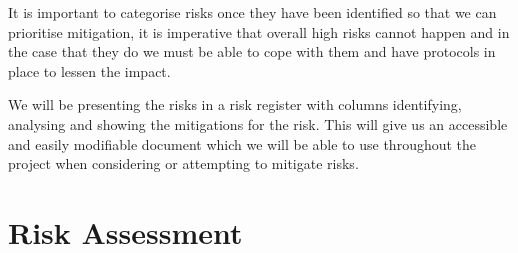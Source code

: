 \documentclass{report}   	%
\begin{document}
It is important to categorise risks once they have been identified so that we can prioritise mitigation, it is imperative that overall high risks cannot happen and in the case that they do we must be able to cope with them and have protocols in place to lessen the impact.

We will be presenting the risks in a risk register with columns identifying, analysing and showing the mitigations for the risk.
This will give us an accessible and easily modifiable document which we will be able to use throughout the project when considering or attempting to mitigate risks.

\newpage
\section{Risk Assessment}
\end{document}
